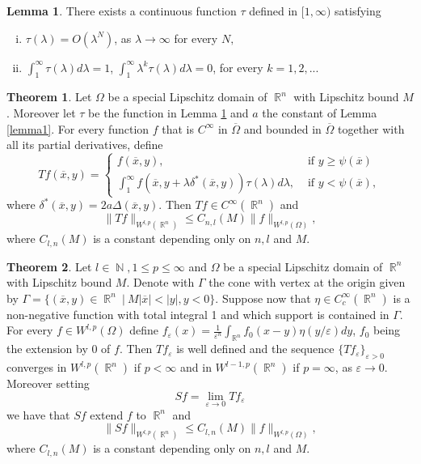\documentclass[12pt]{article}
\theoremstyle{definition}
\newtheorem{theorem}{Theorem}
\newtheorem{lemma}{Lemma}
\DeclareMathOperator\rr{\mathbb{R}}
\DeclareMathOperator\nn{\mathbb{N}}
\begin{document}
\begin{lemma}\label{lemma2}
There exists a continuous function $\tau$ defined in $[1,\infty)$ satisfying
\begin{enumerate}[i)]
	\item $\tau(\lambda)=O(\lambda^N)$, as $\lambda \rightarrow \infty$ for every $N,$
	\item $\int_1^\infty \tau(\lambda)d\lambda=1$, $\int_1^\infty \lambda^k\tau(\lambda)d\lambda=0$, for every $k=1,2,...$
\end{enumerate}
\end{lemma}


\begin{theorem}\label{defT}Let $\Omega$ be a special Lipschitz domain of $\rr^n$ with Lipschitz bound $M$. Moreover let $\tau$ be the function in Lemma \ref{lemma2} and $a$ the constant of Lemma \ref{lemma1}. For every function $f$ that is $C^\infty$ in $\overline \Omega$ and bounded in $\overline \Omega$ together with all its partial derivatives, define
\[ Tf(\overline x, y)= \begin{cases}
						f(\overline x, y), & \text{ if } y\ge\psi(\overline x) \\
						\int_1^\infty f(\overline x, y+ \lambda \delta^*(\overline x,y))\tau(\lambda)d\lambda, & \text{ if } y<\psi(\overline x),		
\end{cases}
\]
where $\delta^*(\overline x,y)=2a\Delta(\overline x, y).$ Then $Tf \in C^\infty(\rr^n)$ and 
\[\| Tf\|_{W^{l,p}(\rr^n)}\le C_{n,l}(M) \| f\|_{W^{l,p}(\Omega)} ,\]
where $C_{l,n}(M)$ is a constant depending only on $n,l$ and $M.$
\end{theorem}

\begin{theorem}Let $l \in \nn,1\le p \le \infty$ and $\Omega$ be a special Lipschitz domain of $\rr^n$ with Lipschitz bound $M$. Denote with $\Gamma$ the cone with vertex at the origin given by $\Gamma=\{(\overline x, y) \in \rr^n \ | \ M |\overline x|<|y|, y<0 \}$. Suppose now that $\eta \in C^\infty_c(\rr^n)$ is a non-negative function with total integral 1 and which support is contained in $\Gamma.$ For every $f \in W^{l,p}(\Omega)$ define $f_\varepsilon(x)=\frac{1}{\varepsilon^n}\int_{\rr^n} f_0(x-y) \eta(y/\varepsilon)dy$, $f_0$ being the extension by 0 of $f$. Then $Tf_\varepsilon $ is well defined and the sequence $\{Tf_\varepsilon \}_{\varepsilon>0}$ converges in $W^{l,p}(\rr^n)$ if $p<\infty$ and in $W^{l-1,p}(\rr^n)$ if $p=\infty$, as $\varepsilon \to 0.$ Moreover setting
\[ Sf=\lim_{\varepsilon \to 0} Tf_\varepsilon\]
we have that $Sf$ extend $f$ to $\rr^n$ and 
\[ \| Sf\|_{W^{l,p}(\rr^n)} \le C_{l,n}(M) \| f\|_{W^{l,p}(\Omega) } ,\] 
where $C_{l,n}(M)$ is a constant depending only on $n,l$ and $M.$
\end{theorem}
\end{document}
